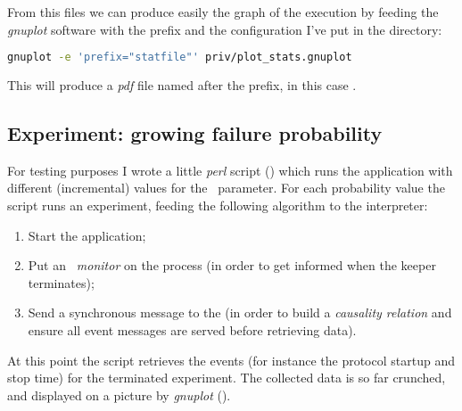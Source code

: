 From this files we can produce easily the graph of the execution by
feeding the \emph{gnuplot} software with the prefix and the configuration
I've put in the  directory:
\begin{lstlisting}[language=bash]
gnuplot -e 'prefix="statfile"' priv/plot_stats.gnuplot
\end{lstlisting}

This will produce a \emph{pdf} file named after the prefix, in this case
.



\subsection{Experiment: growing failure probability}

For testing purposes I wrote a little \emph{perl} script
() which runs the application with different
(incremental) values for the \PCrash\ parameter. For each probability
value the script runs an experiment, feeding the following algorithm to
the interpreter:
\begin{enumerate}
\item   Start the application;
\item   Put an \emph{\Erlang\ monitor} on the  process
        (in order to get informed when the keeper terminates);
\item   Send a synchronous message to the  (in
        order to build a \emph{causality relation} and ensure all event
        messages are served before retrieving data).
\end{enumerate}
At this point the script retrieves the events (for instance the protocol
startup and stop time) for the terminated experiment. The collected data
is so far crunched, and displayed on a picture by \emph{gnuplot}
().

